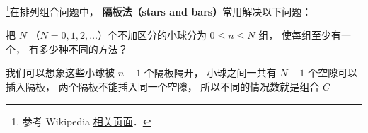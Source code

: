 

\footnote{参考 Wikipedia \href{https://en.wikipedia.org/wiki/Stars_and_bars_(combinatorics)}{相关页面}．}在排列组合问题中， \textbf{隔板法（stars and bars）}常用解决以下问题：

把 $N$ （$N = 0,1,2,\dots$）个不加区分的小球分为 $0\leqslant n\leqslant N$ 组， 使每组至少有一个， 有多少种不同的方法？

我们可以想象这些小球被 $n-1$ 个隔板隔开， 小球之间一共有 $N-1$ 个空隙可以插入隔板， 两个隔板不能插入同一个空隙， 所以不同的情况数就是组合 $C_{}$
